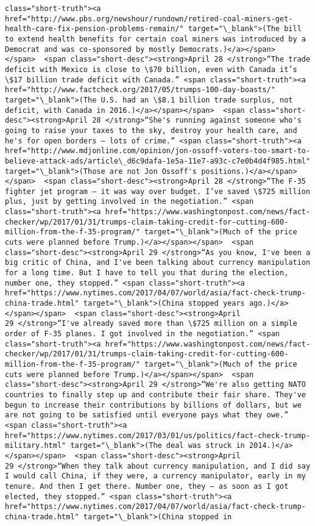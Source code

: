 \documentclass[11pt]{article}
\begin{document}
\begin{Verbatim}[commandchars=\\\{\}]
class="short-truth"><a href="http://www.pbs.org/newshour/rundown/retired-coal-miners-get-health-care-fix-pension-problems-remain/" target="\_blank">(The bill to extend health benefits for certain coal miners was introduced by a Democrat and was co-sponsored by mostly Democrats.)</a></span></span>  <span class="short-desc"><strong>April 28 </strong>“The trade deficit with Mexico is close to \$70 billion, even with Canada it’s \$17 billion trade deficit with Canada.” <span class="short-truth"><a href="http://www.factcheck.org/2017/05/trumps-100-day-boasts/" target="\_blank">(The U.S. had an \$8.1 billion trade surplus, not deficit, with Canada in 2016.)</a></span></span>  <span class="short-desc"><strong>April 28 </strong>“She's running against someone who's going to raise your taxes to the sky, destroy your health care, and he's for open borders — lots of crime.” <span class="short-truth"><a href="http://www.mdjonline.com/opinion/jon-ossoff-voters-too-smart-to-believe-attack-ads/article\_d6c9dafa-1e5a-11e7-a93c-c7e0b4d4f985.html" target="\_blank">(Those are not Jon Ossoff's positions.)</a></span></span>  <span class="short-desc"><strong>April 28 </strong>“The F-35 fighter jet program — it was way over budget. I’ve saved \$725 million plus, just by getting involved in the negotiation.” <span class="short-truth"><a href="https://www.washingtonpost.com/news/fact-checker/wp/2017/01/31/trumps-claim-taking-credit-for-cutting-600-million-from-the-f-35-program/" target="\_blank">(Much of the price cuts were planned before Trump.)</a></span></span>  <span class="short-desc"><strong>April 29 </strong>“As you know, I've been a big critic of China, and I've been talking about currency manipulation for a long time. But I have to tell you that during the election, number one, they stopped.” <span class="short-truth"><a href="https://www.nytimes.com/2017/04/07/world/asia/fact-check-trump-china-trade.html" target="\_blank">(China stopped years ago.)</a></span></span>  <span class="short-desc"><strong>April 29 </strong>“I've already saved more than \$725 million on a simple order of F-35 planes. I got involved in the negotiation.” <span class="short-truth"><a href="https://www.washingtonpost.com/news/fact-checker/wp/2017/01/31/trumps-claim-taking-credit-for-cutting-600-million-from-the-f-35-program/" target="\_blank">(Much of the price cuts were planned before Trump.)</a></span></span>  <span class="short-desc"><strong>April 29 </strong>“We're also getting NATO countries to finally step up and contribute their fair share. They've begun to increase their contributions by billions of dollars, but we are not going to be satisfied until everyone pays what they owe.” <span class="short-truth"><a href="https://www.nytimes.com/2017/03/01/us/politics/fact-check-trump-military.html" target="\_blank">(The deal was struck in 2014.)</a></span></span>  <span class="short-desc"><strong>April 29 </strong>“When they talk about currency manipulation, and I did say I would call China, if they were, a currency manipulator, early in my tenure. And then I get there. Number one, they — as soon as I got elected, they stopped.” <span class="short-truth"><a href="https://www.nytimes.com/2017/04/07/world/asia/fact-check-trump-china-trade.html" target="\_blank">(China stopped in 
\end{Verbatim}
\end{document}
